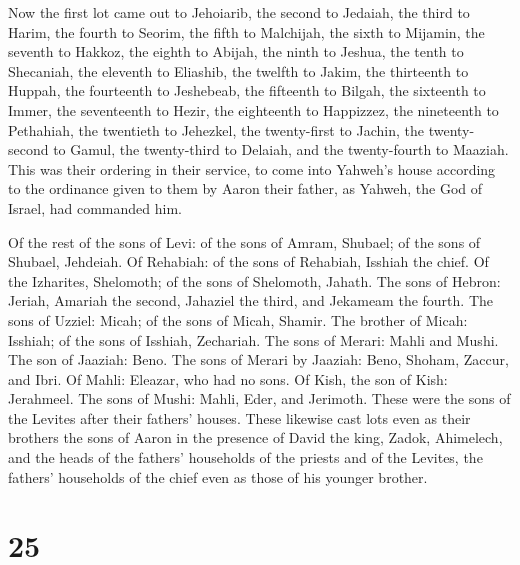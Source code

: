  Now the first lot came out to Jehoiarib, the second to
Jedaiah,  the third to Harim, the fourth to Seorim,
 the fifth to Malchijah, the sixth to Mijamin, 
the seventh to Hakkoz, the eighth to Abijah,  the ninth to
Jeshua, the tenth to Shecaniah,  the eleventh to Eliashib,
the twelfth to Jakim,  the thirteenth to Huppah, the
fourteenth to Jeshebeab,  the fifteenth to Bilgah, the
sixteenth to Immer,  the seventeenth to Hezir, the
eighteenth to Happizzez,  the nineteenth to Pethahiah, the
twentieth to Jehezkel,  the twenty-first to Jachin, the
twenty-second to Gamul,  the twenty-third to Delaiah, and
the twenty-fourth to Maaziah.  This was their ordering in
their service, to come into Yahweh's house according to the ordinance
given to them by Aaron their father, as Yahweh, the God of Israel, had
commanded him.

 Of the rest of the sons of Levi: of the sons of Amram,
Shubael; of the sons of Shubael, Jehdeiah.  Of Rehabiah: of
the sons of Rehabiah, Isshiah the chief.  Of the Izharites,
Shelomoth; of the sons of Shelomoth, Jahath.  The sons of
Hebron: Jeriah, Amariah the second, Jahaziel the third, and Jekameam the
fourth.  The sons of Uzziel: Micah; of the sons of Micah,
Shamir.  The brother of Micah: Isshiah; of the sons of
Isshiah, Zechariah.  The sons of Merari: Mahli and Mushi.
The son of Jaaziah: Beno.  The sons of Merari by Jaaziah:
Beno, Shoham, Zaccur, and Ibri.  Of Mahli: Eleazar, who had
no sons.  Of Kish, the son of Kish: Jerahmeel.
 The sons of Mushi: Mahli, Eder, and Jerimoth. These were
the sons of the Levites after their fathers' houses.  These
likewise cast lots even as their brothers the sons of Aaron in the
presence of David the king, Zadok, Ahimelech, and the heads of the
fathers' households of the priests and of the Levites, the fathers'
households of the chief even as those of his younger brother.

\hypertarget{section-24}{%
\section{25}\label{section-24}}

